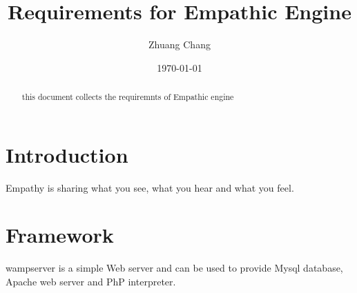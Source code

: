 \documentclass{article}
\begin{document}
\title{Requirements for Empathic Engine}
\author{Zhuang Chang}
\date{\today}
\maketitle
\begin{abstract}
this document collects the requiremnts of Empathic engine

\end{abstract}
\tableofcontents

\section{Introduction}
Empathy is sharing what you see, what you hear and what you
feel.
\section{Framework}
wampserver is a simple Web server and can be used
to provide Mysql database, Apache web server and PhP
interpreter.
\end{document}
